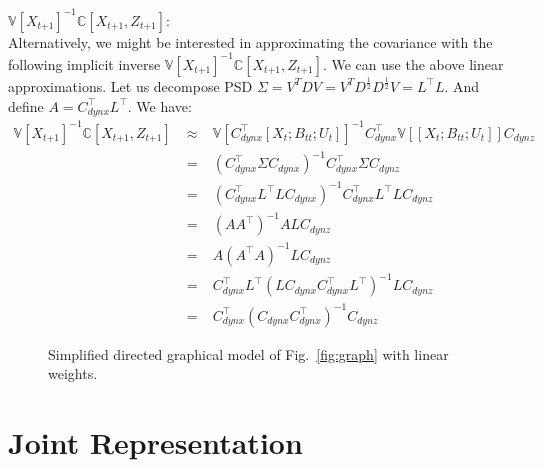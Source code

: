 \documentclass[9pt]{article}
\newcommand{\V}{{\mathbb V}}
\newcommand{\Cov}{{\mathbb C}}
\newcommand{\now}[1]{#1_t}                  %
\newcommand{\new}[1]{#1_{t\mathord{+}1}}    %
\newcommand{\uno}[1]{#1_{tt}}              %
\newcommand{\pne}[1]{#1_{t\mathord{+}1}}   %
\newcommand{\inv}{^{-1}}
\newcommand{\nnn}{\nonumber \\}
\newcommand{\nn}{\nonumber}
\begin{document}
\medskip

\noindent
\underline{$\V[\new{X}]\inv\Cov[\new{X},\pne{Z}]$}: \\
Alternatively, we might be interested in approximating the covariance with the following implicit inverse $\V[\new{X}]\inv\Cov[\new{X},\pne{Z}]$.
We can use the above linear approximations.
Let us decompose PSD $\Sigma = V^T D V = V^T D^{\tfrac{1}{2}}D^{\tfrac{1}{2}} V = L^\top L$. And define $A = C^{\top}_{dynx}L^\top$.
We have:
\begin{eqnarray}
 \V[\new{X}]\inv\Cov[\new{X},\pne{Z}]
 \;&\approx&\; \V[C^{\top}_{dynx}[\now{X};\uno{B};\now{U}]]\inv C^{\top}_{dynx} \V[[\now{X};\uno{B};\now{U}]] C_{dynz} \nnn
 \;&=&\; (C^{\top}_{dynx} \Sigma C_{dynx})\inv C^{\top}_{dynx} \Sigma C_{dynz} \nnn
 \;&=&\; (C^{\top}_{dynx} L^\top L C_{dynx})\inv C^{\top}_{dynx} L^\top L C_{dynz} \nnn
 \;&=&\; (AA^\top)\inv A L C_{dynz} \nnn
 \;&=&\; A (A^\top A)\inv L C_{dynz} \nnn
 \;&=&\; C^{\top}_{dynx} L^\top (L C_{dynx} C^{\top}_{dynx} L^\top)\inv L C_{dynz} \nnn
 \;&=&\; C^{\top}_{dynx} ( C_{dynx} C^{\top}_{dynx} )\inv C_{dynz} \nn
\end{eqnarray}


\begin{figure}[h]
\centering
{}
\caption{Simplified directed graphical model of Fig.~\ref{fig:graph} with linear weights.}
\label{fig:graph-szc-linear}
\end{figure}


\section{Joint Representation}
\end{document}
